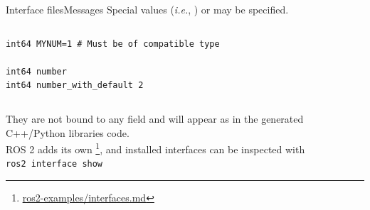 \begin{frame}[fragile]{Interface files}{Messages}
	Special values (\emph{i.e.}, ) or  may be specified.

	\begin{columns}
		\begin{lstlisting}[language=ros2msg, caption=Definition of an example message with a constant and a default value.]
int64 MYNUM=1 # Must be of compatible type

int64 number
int64 number_with_default 2\end{lstlisting}
	\end{columns}

	They are not bound to any field and will appear as  in the generated C++/Python libraries code.\\
	ROS 2 adds its own \footnote{\href{https://github.com/IntelligentSystemsLabUTV/ros2-examples/blob/jazzy/interfaces.md}{\color{blue}\underline{ros2-examples/interfaces.md}}}, and installed interfaces can be inspected with\\
  \medskip
	\texttt{ros2 interface show}
\end{frame}


